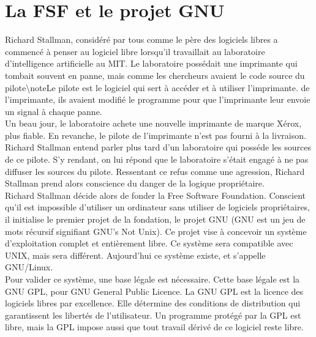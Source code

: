 \documentclass{article}
\begin{document}
\section{La FSF et le projet GNU} 
Richard Stallman, considéré par tous comme le père des logiciels libres a commencé à penser au logiciel libre lorsqu'il travaillait au laboratoire d'intelligence artificielle au MIT. Le laboratoire possédait une imprimante qui tombait souvent en panne, mais comme les chercheurs avaient le code source du pilote\textbackslash note{Le pilote est le logiciel qui sert à accéder et à utiliser l'imprimante.} de l'imprimante, ils avaient modifié le programme pour que l'imprimante leur envoie un signal à chaque panne. \vspace{5mm} \\
Un beau jour, le laboratoire achete une nouvelle imprimante de marque Xérox, plus fiable. En revanche, le pilote de l'imprimante n'est pas fourni à la livraison. Richard Stallman entend parler plus tard d'un laboratoire qui posséde les sources de ce pilote. S'y rendant, on lui répond que le laboratoire s'était engagé à ne pas diffuser les sources du pilote. Ressentant ce refus comme une agression, Richard Stallman prend alors conscience du danger de la logique propriétaire. \vspace{5mm} \\
Richard Stallman décide alors de fonder la Free Software Foundation. Conscient qu'il est impossible d'utiliser un ordinateur sans utiliser de logiciels propriétaires, il initialise le premier projet de la fondation, le projet GNU (GNU est un jeu de mots récursif signifiant GNU's Not Unix). Ce projet vise à concevoir un système d'exploitation complet et entièrement libre. Ce système sera compatible avec UNIX, mais sera différent. Aujourd'hui ce système existe, et s'appelle GNU/Linux. \vspace{5mm} \\
Pour valider ce système, une base légale est nécessaire. Cette base légale est la GNU GPL, pour GNU General Public Licence. La GNU GPL est la licence des logiciels libres par excellence. Elle détermine des conditions de distribution qui garantissent les libertés de l'utilisateur. Un programme protégé par la GPL est libre, mais la GPL impose aussi que tout travail dérivé de ce logiciel reste libre.

\newpage
\end{document}
